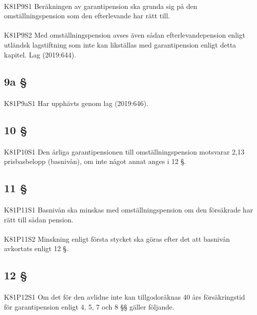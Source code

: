 \documentclass[a4paper,notitlepage,openany,10pt]{book}
\begin{document}
\paragraph*{}
{\tiny K81P9S1}
Beräkningen av garantipension ska grunda sig på den omställningspension som den efterlevande har rätt till.
\paragraph*{}
{\tiny K81P9S2}
Med omställningspension avses även sådan efterlevandepension enligt utländsk lagstiftning som inte kan likställas med garantipension enligt detta kapitel.
Lag (2019:644).
\subsection*{9a §}
\paragraph*{}
{\tiny K81P9aS1}
Har upphävts genom
lag (2019:646).
\subsection*{10 §}
\paragraph*{}
{\tiny K81P10S1}
Den årliga garantipensionen till omställningspension motsvarar 2,13 prisbasbelopp (basnivån), om inte något annat anges i 12 §.
\subsection*{11 §}
\paragraph*{}
{\tiny K81P11S1}
Basnivån ska minskas med omställningspension om den försäkrade har rätt till sådan pension.
\paragraph*{}
{\tiny K81P11S2}
Minskning enligt första stycket ska göras efter det att basnivån avkortats enligt 12 §.
\subsection*{12 §}
\paragraph*{}
{\tiny K81P12S1}
Om det för den avlidne inte kan tillgodoräknas 40 års försäkringstid för garantipension enligt 4, 5, 7 och 8 §§ gäller följande.
\end{document}
